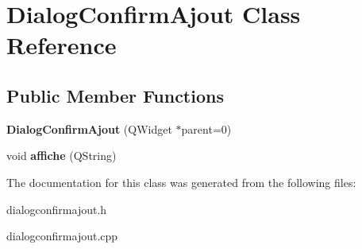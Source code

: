 \hypertarget{classDialogConfirmAjout}{\section{Dialog\-Confirm\-Ajout Class Reference}
\label{classDialogConfirmAjout}
}
\subsection*{Public Member Functions}
\begin{DoxyCompactItemize}
\item 
\hypertarget{classDialogConfirmAjout_a6c1e384266f1075aba773cf3f09c0d89}{{\bfseries Dialog\-Confirm\-Ajout} (Q\-Widget $\ast$parent=0)}\label{classDialogConfirmAjout_a6c1e384266f1075aba773cf3f09c0d89}

\item 
\hypertarget{classDialogConfirmAjout_a8d51c08ee586615094be978ea4fecd9a}{void {\bfseries affiche} (Q\-String)}\label{classDialogConfirmAjout_a8d51c08ee586615094be978ea4fecd9a}

\end{DoxyCompactItemize}


The documentation for this class was generated from the following files\-:\begin{DoxyCompactItemize}
\item 
dialogconfirmajout.\-h\item 
dialogconfirmajout.\-cpp\end{DoxyCompactItemize}

